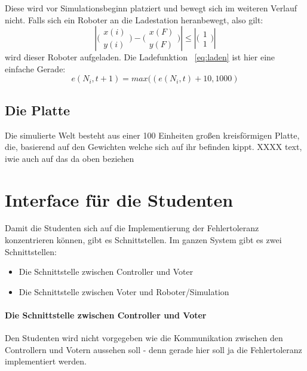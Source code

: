 Diese wird vor Simulationsbeginn platziert und bewegt sich im weiteren Verlauf nicht.
Falls sich ein Roboter an die Ladestation heranbewegt, also gilt: 
\begin{equation}
    \label{eq:dist}
 |\bigl(\begin{smallmatrix} x(i) \\ y(i) \end{smallmatrix}\bigr) - \bigl(\begin{smallmatrix} x(F) \\ y(F) \end{smallmatrix}\bigr)| \leq |\bigl(\begin{smallmatrix} 1 \\ 1 \end{smallmatrix}\bigr)|
\end{equation}
wird dieser Roboter aufgeladen. Die Ladefunktion ~\ref{eq:laden} ist hier eine einfache Gerade:
\begin{equation}
    \label{eq:laden}
	e(N_i, t + 1) = max((e(N_i, t) + 10, 1000) 
\end{equation}

\subsection{Die Platte}\label{plate}
Die simulierte Welt besteht aus einer 100 Einheiten gro{\ss}en kreisf{\"{o}}rmigen Platte, die, basierend auf den Gewichten welche sich auf ihr befinden kippt.
XXXX \todo{} text, iwie auch auf das da oben beziehen



\clearpage
\section{Interface f{\"{u}}r die Studenten}\label{interface}
Damit die Studenten sich auf die Implementierung der Fehlertoleranz konzentrieren k{\"{o}}nnen, gibt es Schnittstellen.
Im ganzen System gibt es zwei Schnittstellen:
\begin{itemize}
\item Die Schnittstelle zwischen Controller und Voter
\item Die Schnittstelle zwischen Voter und Roboter/Simulation
\end{itemize}

\paragraph{Die Schnittstelle zwischen Controller und Voter} Den Studenten wird nicht vorgegeben wie die Kommunikation zwischen den Controllern und Votern aussehen soll - denn gerade hier soll ja die Fehlertoleranz implementiert werden.


